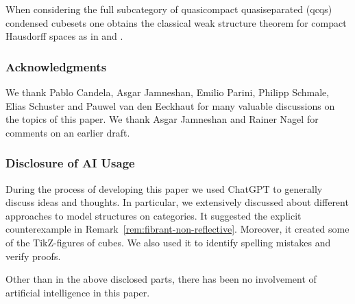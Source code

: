 When considering the full subcategory of quasicompact quasiseparated (qcqs) condensed cubesets
one obtains the classical weak structure theorem for compact Hausdorff spaces as in
\cite[Proposition 2.1.9]{Candela2017a} and \cite[Theorem 5.4]{Gutman2020}.


\subsubsection*{Acknowledgments}

We thank Pablo Candela, Asgar Jamneshan, Emilio Parini, Philipp Schmale, Elias Schuster and Pauwel van den Eeckhaut for many valuable discussions on the topics of this paper.
We thank Asgar Jamneshan and Rainer Nagel for comments on an earlier draft.

\subsubsection*{Disclosure of AI Usage}

During the process of developing this paper we used ChatGPT to generally discuss ideas and thoughts.
In particular, we extensively discussed about different approaches to model structures on categories.
It suggested the explicit counterexample in Remark~\ref{rem:fibrant-non-reflective}.
Moreover, it created some of the TikZ-figures of cubes.
We also used it to identify spelling mistakes and verify proofs.

Other than in the above disclosed parts, there has been no involvement of artificial intelligence in this paper.
